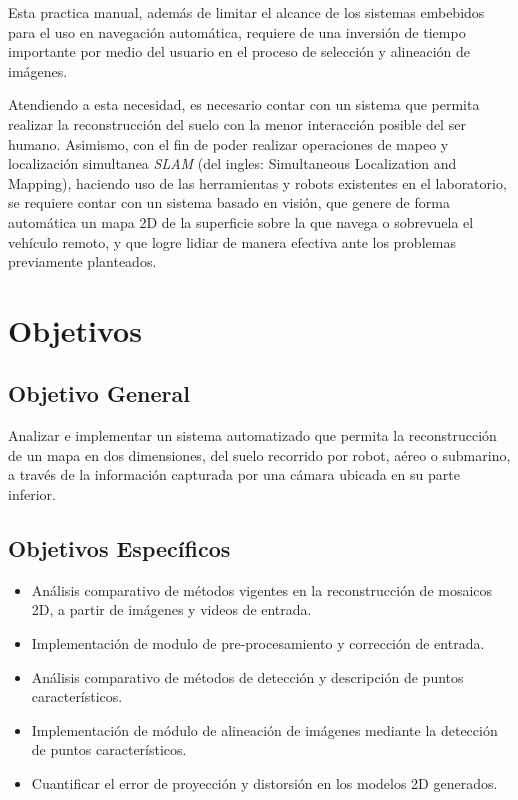 Esta practica manual, además de limitar el alcance de los sistemas embebidos para el uso en navegación automática, requiere de una inversión de tiempo importante por medio del usuario en el proceso de selección y alineación de imágenes.


Atendiendo a esta necesidad, es necesario contar con un sistema que permita realizar la reconstrucción del suelo con la menor interacción posible del ser humano. Asimismo, con el fin de poder realizar operaciones de mapeo y localización simultanea \textit{SLAM} (del ingles: Simultaneous Localization and Mapping), haciendo uso de las herramientas y robots existentes en el laboratorio, se requiere contar con un sistema basado en visión, que genere de forma automática un mapa 2D de la superficie sobre la que navega o sobrevuela el vehículo remoto, y que logre lidiar de manera efectiva ante los problemas previamente planteados.


\section{Objetivos}

\subsection{Objetivo General}

Analizar e implementar un sistema automatizado que permita la reconstrucción de un mapa en dos dimensiones, del suelo recorrido por robot, aéreo o submarino, a través de la información capturada por una cámara ubicada en su parte inferior.

\subsection{Objetivos Específicos}

\begin{itemize}
	\item Análisis comparativo de métodos vigentes en la reconstrucción de mosaicos 2D, a partir de imágenes y videos de entrada.
	\item Implementación de modulo de pre-procesamiento y corrección de entrada.
	\item Análisis comparativo de métodos de detección y descripción de puntos característicos.
	\item Implementación de módulo de alineación de imágenes mediante la detección de puntos característicos.
	\item Cuantificar el error de proyección y distorsión en los modelos 2D generados.
\end{itemize}

